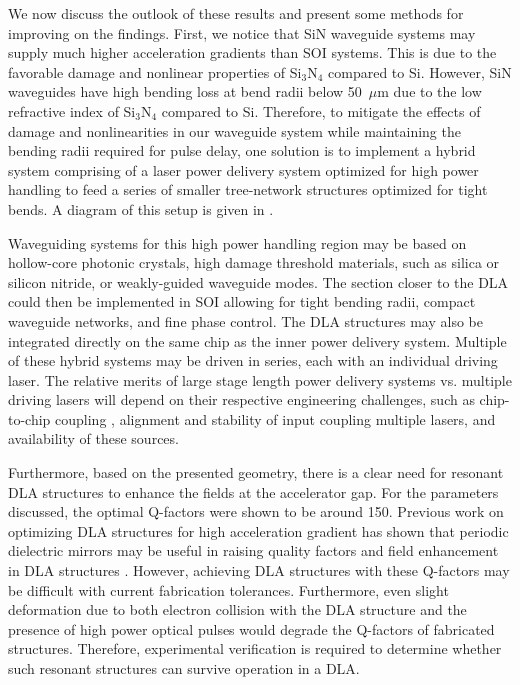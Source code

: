
We now discuss the outlook of these results and present some methods for improving on the findings.
First, we notice that SiN waveguide systems may supply much higher acceleration gradients than SOI systems.  This is due to the favorable damage and nonlinear properties of Si$_3$N$_4$ compared to Si.  However, SiN waveguides have high bending loss at bend radii below 50~$\mu$m due to the low refractive index of Si$_3$N$_4$ compared to Si.  Therefore, to mitigate the effects of damage and nonlinearities in our waveguide system while maintaining the bending radii required for pulse delay, one solution is to implement a hybrid system comprising of a laser power delivery system optimized for high power handling to feed a series of smaller tree-network structures optimized for tight bends. A diagram of this setup is given in . 


Waveguiding systems for this high power handling region may be based on hollow-core photonic crystals, high damage threshold materials, such as silica or silicon nitride, or weakly-guided waveguide modes. The section closer to the DLA could then be implemented in SOI allowing for tight bending radii, compact waveguide networks, and fine phase control.  The DLA structures may also be integrated directly on the same chip as the inner power delivery system.  Multiple of these hybrid systems may be driven in series, each with an individual driving laser.  The relative merits of large stage length power delivery systems vs. multiple driving lasers will depend on their respective engineering challenges, such as chip-to-chip coupling \cite{shoji2002low,sacher2017tri}, alignment and stability of input coupling multiple lasers, and availability of these sources.  

Furthermore, based on the presented geometry, there is a clear need for resonant DLA structures to enhance the fields at the accelerator gap. For the parameters discussed, the optimal Q-factors were shown to be around 150. Previous work on optimizing DLA structures for high acceleration gradient has shown that periodic dielectric mirrors may be useful in raising quality factors and field enhancement in DLA structures \cite{hughes_method_2017, mizrahi2004optical, niedermayer2017designing, wei2017dual}. However, achieving DLA structures with these Q-factors may be difficult with current fabrication tolerances. Furthermore, even slight deformation due to both electron collision with the DLA structure and the presence of high power optical pulses would degrade the Q-factors of fabricated structures. Therefore, experimental verification is required to determine whether such resonant structures can survive operation in a DLA.

